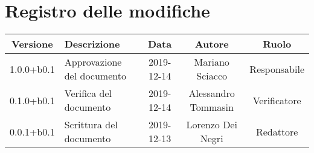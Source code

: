 \section*{Registro delle modifiche}

\begin{center}
	\begin{longtable}{|c|p{3cm}|c|c|c|}
	\hline
	\rowcolor{lighter-grayer}
	\textbf{Versione} & \textbf{Descrizione} & \textbf{Data} & \textbf{Autore} & \textbf{Ruolo} \\
	\hline
	\endfirsthead



	1.0.0+b0.1 & Approvazione del documento & 2019-12-14 & Mariano Sciacco & Responsabile \\
	\hline
	0.1.0+b0.1 & Verifica del documento & 2019-12-14 & Alessandro Tommasin & Verificatore \\
	\hline
	0.0.1+b0.1 & Scrittura del documento & 2019-12-13 & Lorenzo Dei Negri & Redattore \\
	\hline

	\end{longtable}
\end{center}
